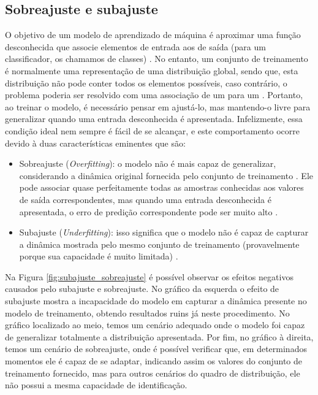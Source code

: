 \documentclass[
	12pt,				%
	oneside,			%
	a4paper,			%
	english,			%
	brazil				%
	]{abntex2ppgsi}
\begin{document}
\subsection{Sobreajuste e subajuste}
O objetivo de um modelo de aprendizado de máquina é aproximar uma função desconhecida que associe elementos de entrada aos de saída (para um classificador, os chamamos de classes) \cite{bonaccorso2017machine}. No entanto, um conjunto de treinamento é normalmente uma representação de uma distribuição global, sendo que, esta distribuição não pode conter todos os elementos possíveis, caso contrário, o problema poderia ser resolvido com uma associação de um para um \cite{bonaccorso2017machine}. Portanto, ao treinar o modelo, é necessário pensar em ajustá-lo, mas mantendo-o livre para generalizar quando uma entrada desconhecida é apresentada. Infelizmente, essa condição ideal nem sempre é fácil de se alcançar, e este comportamento ocorre devido à duas características eminentes que são:

\begin{itemize}
  \item Sobreajuste (\textit{Overfitting}): o modelo não é mais capaz de generalizar, considerando a dinâmica original fornecida pelo conjunto de treinamento \cite{bonaccorso2017machine}. Ele pode associar quase perfeitamente todas as amostras conhecidas aos valores de saída correspondentes, mas quando uma entrada desconhecida é apresentada, o erro de predição correspondente pode ser muito alto \cite{bonaccorso2017machine}.

  \item Subajuste (\textit{Underfitting}): isso significa que o modelo não é capaz de capturar a dinâmica mostrada pelo mesmo conjunto de treinamento (provavelmente porque sua capacidade é muito limitada) \cite{bonaccorso2017machine}.
\end{itemize}

Na Figura \ref{fig:subajuste_sobreajuste} é possível observar os efeitos negativos causados pelo subajuste e sobreajuste. No gráfico da esquerda o efeito de subajuste mostra a incapacidade do modelo em capturar a dinâmica presente no modelo de treinamento, obtendo resultados ruins já neste procedimento. No gráfico localizado ao meio, temos um cenário adequado onde o modelo foi capaz de generalizar totalmente a distribuição apresentada. Por fim, no gráfico à direita, temos um cenário de sobreajuste, onde é possível verificar que, em determinados momentos ele é capaz de se adaptar, indicando assim os valores do conjunto de treinamento fornecido, mas para outros cenários do quadro de distribuição, ele não possui a mesma capacidade de identificação.
\end{document}
